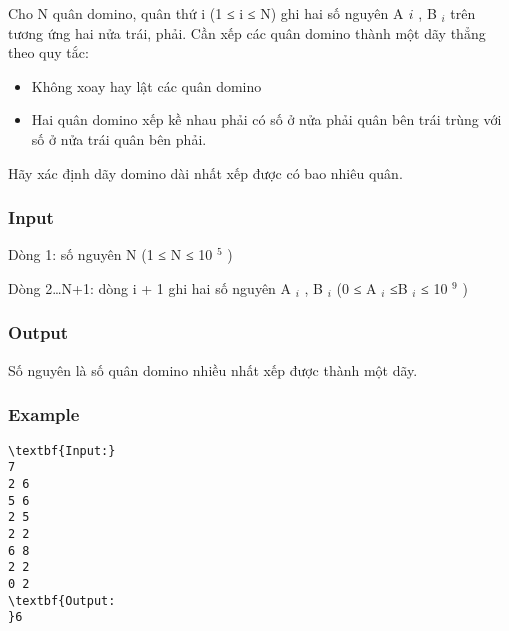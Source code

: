 

Cho N quân domino, quân thứ i (1 ≤ i ≤ N) ghi hai số nguyên A $_ ­i $ , B $_ i $ trên tương ứng hai nửa trái, phải. Cần xếp các quân domino thành một dãy thẳng theo quy tắc:
\begin{itemize}
	\item Không xoay hay lật các quân domino
	\item Hai quân domino xếp kề nhau phải có số ở nửa phải quân bên trái trùng với số ở nửa trái quân bên phải.
\end{itemize}

Hãy xác định dãy domino dài nhất xếp được có bao nhiêu quân.

\subsubsection{Input}

Dòng 1: số nguyên N (1 ≤ N ≤ 10 $^ 5 $ )

Dòng 2…N+1: dòng i + 1 ghi hai số nguyên A $_ i $ , B $_ i $ (0 ≤ A $_ i $ ≤B $_ i $ ≤ 10 $^ 9 $ )

\subsubsection{Output}

Số nguyên là số quân domino nhiều nhất xếp được thành một dãy.

\subsubsection{Example}
\begin{verbatim}
\textbf{Input:}
7
2 6
5 6
2 5
2 2
6 8
2 2
0 2 
\textbf{Output:
}6\end{verbatim}